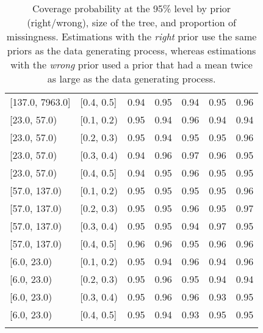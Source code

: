 \begin{table}[ht]
\begin{tabular}{llrrrrr}
  {[137.0, 7963.0]} & {[0.4, 0.5]} & 0.94 & 0.95 & 0.94 & 0.95 & 0.96 \\ 
  {[23.0, 57.0)} & {[0.1, 0.2)} & 0.95 & 0.94 & 0.96 & 0.94 & 0.94 \\ 
  {[23.0, 57.0)} & {[0.2, 0.3)} & 0.95 & 0.94 & 0.95 & 0.95 & 0.96 \\ 
  {[23.0, 57.0)} & {[0.3, 0.4)} & 0.94 & 0.96 & 0.97 & 0.96 & 0.95 \\ 
  {[23.0, 57.0)} & {[0.4, 0.5]} & 0.94 & 0.95 & 0.96 & 0.95 & 0.95 \\ 
  {[57.0, 137.0)} & {[0.1, 0.2)} & 0.95 & 0.95 & 0.95 & 0.95 & 0.96 \\ 
  {[57.0, 137.0)} & {[0.2, 0.3)} & 0.95 & 0.95 & 0.96 & 0.95 & 0.97 \\ 
  {[57.0, 137.0)} & {[0.3, 0.4)} & 0.95 & 0.95 & 0.94 & 0.97 & 0.95 \\ 
  {[57.0, 137.0)} & {[0.4, 0.5]} & 0.96 & 0.96 & 0.95 & 0.96 & 0.96 \\ 
  {[6.0, 23.0)} & {[0.1, 0.2)} & 0.95 & 0.94 & 0.96 & 0.94 & 0.96 \\ 
  {[6.0, 23.0)} & {[0.2, 0.3)} & 0.95 & 0.96 & 0.95 & 0.94 & 0.94 \\ 
  {[6.0, 23.0)} & {[0.3, 0.4)} & 0.95 & 0.96 & 0.96 & 0.93 & 0.95 \\ 
  {[6.0, 23.0)} & {[0.4, 0.5]} & 0.95 & 0.94 & 0.93 & 0.95 & 0.95 \\ 
   \bottomrule
\multicolumn{7}{l}{}\\
\end{tabular}
\caption{Coverage probability at the 95\% level by prior (right/wrong), size of the tree, and proportion of missingness.  Estimations with the \emph{right} prior use the same priors as the data generating process, whereas estimations with the \emph{wrong} prior used a prior that had a mean twice as large as the data generating process.} 
\label{tab:coverage95-method-size-missigness}
\end{table}
